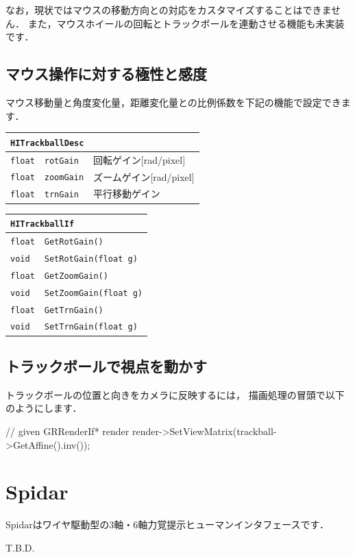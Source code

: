 \KLUDGE なお，現状ではマウスの移動方向との対応をカスタマイズすることはできません．
\KLUDGE また，マウスホイールの回転とトラックボールを連動させる機能も未実装です．

\subsection*{マウス操作に対する極性と感度}

\KLUDGE マウス移動量と角度変化量，距離変化量との比例係数を下記の機能で設定できます．

\begin{center}
\begin{tabular}{p{.15\hsize}p{.35\hsize}p{.4\hsize}}
\multicolumn{3}{l}{\texttt{HITrackballDesc}}							\\ \midrule
\texttt{float}	&	\texttt{rotGain}		& 回転ゲイン[rad/pixel]		\\
\texttt{float}	&	\texttt{zoomGain}		& ズームゲイン[rad/pixel]	\\
\texttt{float}	&	\texttt{trnGain}		& 平行移動ゲイン			\\
\end{tabular}
\end{center}

\begin{center}
\begin{tabular}{p{.15\hsize}p{.75\hsize}}
\multicolumn{2}{l}{\texttt{HITrackballIf}}									\\ \midrule
\texttt{float} 	& \texttt{GetRotGain()}			\\
\texttt{void} 	& \texttt{SetRotGain(float g)}	\\
\texttt{float} 	& \texttt{GetZoomGain()}		\\
\texttt{void} 	& \texttt{SetZoomGain(float g)}	\\
\texttt{float} 	& \texttt{GetTrnGain()}			\\
\texttt{void} 	& \texttt{SetTrnGain(float g)}	\\
\end{tabular}
\end{center}

\subsection*{トラックボールで視点を動かす}

\KLUDGE トラックボールの位置と向きをカメラに反映するには，
\KLUDGE 描画処理の冒頭で以下のようにします．

\begin{sourcecode}
// given GRRenderIf* render
render->SetViewMatrix(trackball->GetAffine().inv());
\end{sourcecode}

\section{Spidar}

Spidarはワイヤ駆動型の3軸・6軸力覚提示ヒューマンインタフェースです．

T.B.D. 


